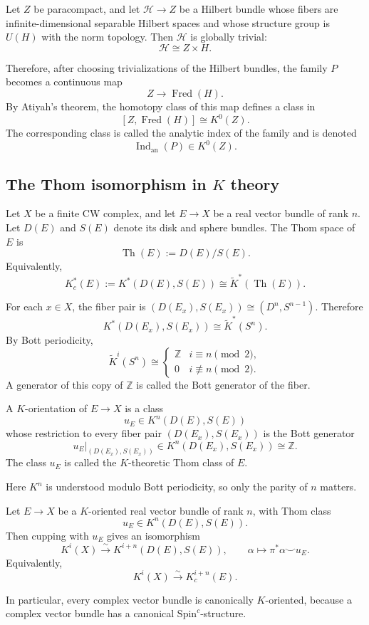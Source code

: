 \documentclass[12pt]{article}
\DeclareMathOperator{\Fred}{Fred}
\begin{document}
\begin{corollary}
Let \(Z\) be paracompact, and let \(\mathcal H\to Z\) be a Hilbert bundle whose fibers are infinite-dimensional separable Hilbert spaces and whose structure group is \(U(H)\) with the norm topology. Then \(\mathcal H\) is globally trivial:
\[
\mathcal H\cong Z\times H.
\]
\end{corollary}
Therefore, after choosing trivializations of the Hilbert bundles, the
family \(P\) becomes a continuous map
\[
Z\to \Fred(H).
\]
By Atiyah's theorem, the homotopy class of this map defines a class in
\[
[Z,\Fred(H)]\cong K^0(Z).
\]
The corresponding class is called the analytic index of the family and is denoted
\[
\operatorname{Ind}_{\mathrm{an}}(P)\in K^0(Z).
\]

\subsection{The Thom isomorphism in $K$ theory}

Let \(X\) be a finite CW complex, and let \(E\to X\) be a real vector bundle of rank \(n\). Let \(D(E)\) and \(S(E)\) denote its disk and sphere bundles. The Thom space of \(E\) is
\[
\operatorname{Th}(E):=D(E)/S(E).
\]
Equivalently,
\[
K_c^*(E):=K^*(D(E),S(E))\cong \widetilde K^*(\operatorname{Th}(E)).
\]

For each \(x\in X\), the fiber pair is \((D(E_x),S(E_x))\cong (D^n,S^{n-1})\). Therefore
\[
K^*(D(E_x),S(E_x))\cong \widetilde K^*(S^n).
\]
By Bott periodicity,
\[
\widetilde K^i(S^n)\cong
\begin{cases}
\mathbb Z & i\equiv n \pmod 2,\\
0 & i\not\equiv n \pmod 2.
\end{cases}
\]
A generator of this copy of \(\mathbb Z\) is called the Bott generator of the fiber.

\begin{definition}[\(K\)-orientation]
A \(K\)-orientation of \(E\to X\) is a class
\[
u_E\in K^n(D(E),S(E))
\]
whose restriction to every fiber pair \((D(E_x),S(E_x))\) is the Bott generator
\[
u_E|_{(D(E_x),S(E_x))}\in K^n(D(E_x),S(E_x))\cong \mathbb Z.
\]
The class \(u_E\) is called the \(K\)-theoretic Thom class of \(E\).
\end{definition}

Here \(K^n\) is understood modulo Bott periodicity, so only the parity of \(n\) matters.

\begin{theorem}
Let \(E\to X\) be a \(K\)-oriented real vector bundle of rank \(n\), with Thom class
\[
u_E\in K^n(D(E),S(E)).
\]
Then cupping with \(u_E\) gives an isomorphism
\[
K^i(X)\xrightarrow{\sim}K^{i+n}(D(E),S(E)),
\qquad
\alpha\mapsto \pi^*\alpha\smile u_E.
\]
Equivalently,
\[
K^i(X)\xrightarrow{\sim}K_c^{i+n}(E).
\]
\end{theorem}
In particular, every complex vector bundle is canonically \(K\)-oriented, because a complex vector bundle has a canonical \(\mathrm{Spin}^c\)-structure.
\end{document}
